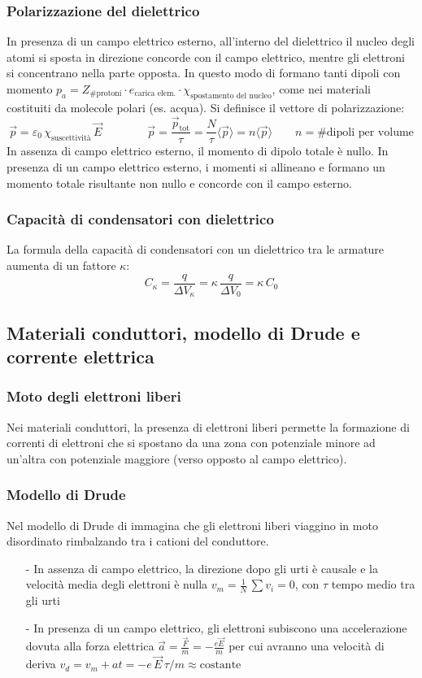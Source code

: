 \documentclass[a4paper]{article}
\begin{document}
\subsubsection*{Polarizzazione del dielettrico}
In presenza di un campo elettrico esterno, all'interno del dielettrico il nucleo degli atomi si sposta in direzione concorde
con il campo elettrico, mentre gli elettroni si concentrano nella parte opposta. In questo modo di formano tanti dipoli con
momento \(p_a = Z_\text{\# protoni} \cdot e_\text{carica elem.} \cdot \chi_\text{spostamento del nucleo}\), come nei materiali
costituiti da molecole polari (es. acqua). Si definisce il vettore di polarizzazione:
\[\vec{p} = \varepsilon_0 \, \chi_\text{suscettività} \, \vec{E} \qquad \qquad \vec{p} = \frac{\vec{p}_\text{tot}}{\tau} = \frac{N}{\tau} \langle \vec{p} \rangle  = n \langle \vec{p} \rangle  \qquad n = \text{\# dipoli per volume}\]
In assenza di campo elettrico esterno, il momento di dipolo totale è nullo. In presenza di un campo elettrico esterno, i momenti
si allineano e formano un momento totale risultante non nullo e concorde con il campo esterno.

\subsubsection*{Capacità di condensatori con dielettrico}
La formula della capacità di condensatori con un dielettrico tra le armature aumenta di un fattore \(\kappa\):
\[C_\kappa = \frac{q}{\Delta V_\kappa} = \kappa \, \frac{q}{\Delta V_0} = \kappa \, C_0\]

\subsection{Materiali conduttori, modello di Drude e corrente elettrica}
\subsubsection*{Moto degli elettroni liberi}
Nei materiali conduttori, la presenza di elettroni liberi permette la formazione di correnti di elettroni che si spostano da una
zona con potenziale minore ad un'altra con potenziale maggiore (verso opposto al campo elettrico).

\subsubsection*{Modello di Drude}
Nel modello di Drude di immagina che gli elettroni liberi viaggino in moto disordinato rimbalzando tra i cationi del conduttore.
\begin{itemize}[topsep=3pt, itemsep=0pt]
	\item[-] In assenza di campo elettrico, la direzione dopo gli urti è causale e la velocità media degli elettroni è nulla
	\(v_m = \frac{1}{N} \, \sum v_i = 0\), con \(\tau\) tempo medio tra gli urti
	\item[-] In presenza di un campo elettrico, gli elettroni subiscono una accelerazione dovuta alla forza elettrica
	\(\vec{a} = \frac{\vec{F}}{m} = - \frac{e \vec{E}}{m}\) per cui avranno una velocità di deriva \(v_d = v_m + a t = - e \, \vec{E} \, \tau / m \approx \text{costante}\)
\end{itemize}
\end{document}
